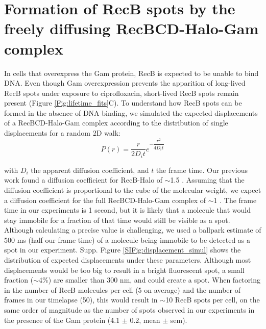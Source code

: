 
\section{Formation of RecB spots by the freely diffusing RecBCD-Halo-Gam complex}
\label{note:spurious_spots}
In cells that overexpress the Gam protein, RecB is expected to be unable to bind DNA. Even though Gam overexpression prevents the apparition of long-lived RecB spots under exposure to ciprofloxacin, short-lived RecB spots remain present (Figure \ref{Fig:lifetime_fits}C). To understand how RecB spots can be formed in the absence of DNA binding, we simulated the expected displacements of a RecBCD-Halo-Gam complex according to the distribution of single displacements for a random 2D walk:
\begin{equation}
    P(r) = \dfrac{r}{2D_i t}e^{-\dfrac{r^2}{4D_i t}}
\end{equation}

with $D_i$ the apparent diffusion coefficient, and $t$ the frame time. Our previous work found a diffusion coefficient for RecB-Halo of $\sim$1.5 \ums. Assuming that the diffusion coefficient is proportional to the cube of the molecular weight, we expect a diffusion coefficient for the full RecBCD-Halo-Gam complex of $\sim$1 \ums. The frame time in our experiments is 1 second, but it is likely that a molecule that would stay immobile for a fraction of that time would still be visible as a spot. Although calculating a precise value is challenging, we used a ballpark estimate of 500 ms (half our frame time) of a molecule being immobile to be detected as a spot in our experiment. Supp. Figure \ref{SIFig:displacement_simul} shows the distribution of expected displacements under these parameters. Although most displacements would be too big to result in a bright fluorescent spot, a small fraction ($\sim$4\%) are smaller than 300 nm, and could create a spot. When factoring in the number of RecB molecules per cell (5 on average) and the number of frames in our timelapse (50), this would result in $\sim$10 RecB spots per cell, on the same order of magnitude as the number of spots observed in our experiments in the presence of the Gam protein (4.1 $\pm$ 0.2, mean $\pm$ sem).

\clearpage

\setlength\intextsep{40pt}


